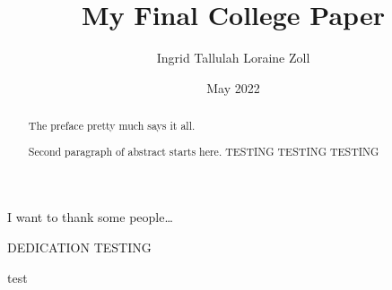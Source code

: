 \documentclass[12pt,twoside]{reedthesis}
\title{My Final College Paper}
\author{Ingrid Tallulah Loraine Zoll}
\date{May 2022}
\begin{document}
  \maketitle

\frontmatter %
\pagestyle{empty} %
  \begin{acknowledgements}
    I want to thank some people\ldots{}
  \end{acknowledgements}

  \hypersetup{linkcolor=black}
  \setcounter{secnumdepth}{2}
  \setcounter{tocdepth}{2}
  \tableofcontents

  \listoftables

  \listoffigures
  \begin{abstract}
    The preface pretty much says it all.

    \par

    Second paragraph of abstract starts here.
    TESTING TESTING TESTING
  \end{abstract}
  \begin{dedication}
    DEDICATION TESTING

    test
  \end{dedication}
\mainmatter %
\pagestyle{fancyplain} %
\end{document}
